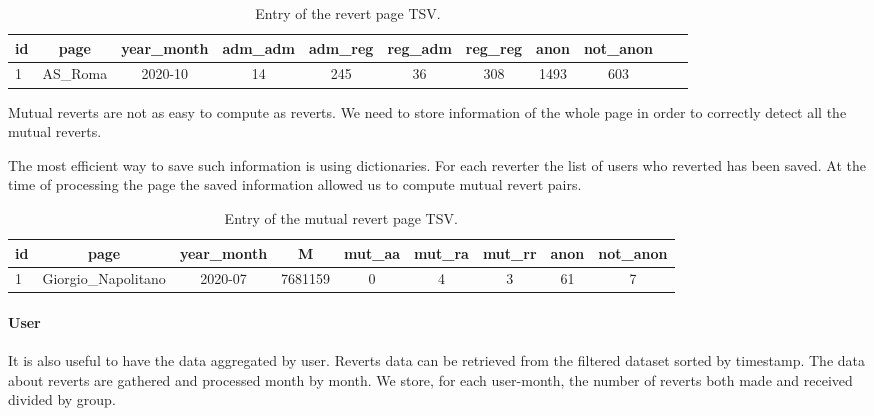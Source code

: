 \begin{table}[H]
    \centering
    \begin{tabularx}{\columnwidth}{@{}Xcccccccccc@{}}
        \midrule
        \textbf{id} & \textbf{page} & \textbf{year\_month} & \textbf{adm\_adm} & \textbf{adm\_reg} & \textbf{reg\_adm} & \textbf{reg\_reg} & \textbf{anon} & \textbf{not\_anon}\\ \toprule
        1 & AS\_Roma & 2020-10 & 14 & 245 & 36 & 308 & 1493 & 603 \\
        
         \bottomrule
    \end{tabularx}
    
    \caption{Entry of the revert page TSV. \label{table:revertpage}}
\end{table}

Mutual reverts are not as easy to compute as reverts. We need to store information of the whole page
in order to correctly detect all the mutual reverts.

The most efficient way to save such information is using dictionaries. For each reverter the list of
users who reverted has been saved. At the time of processing the page the saved information allowed
us to compute mutual revert pairs.

\begin{table}[H]
    \centering
    \begin{tabularx}{\columnwidth}{@{}Xcccccccc@{}}
        \midrule
        \textbf{id} & \textbf{page} & \textbf{year\_month} & \textbf{M}& \textbf{mut\_aa} & \textbf{mut\_ra}  & \textbf{mut\_rr} & \textbf{anon} & \textbf{not\_anon}\\ \toprule
        1 & Giorgio\_Napolitano & 2020-07 & 7681159 & 0 & 4  & 3 & 61 & 7 \\
         \bottomrule
    \end{tabularx}
    
    \caption{Entry of the mutual revert page TSV. \label{table:mutualpage}}
\end{table}

\paragraph*{User}
It is also useful to have the data aggregated by user. Reverts data can be retrieved from the
filtered dataset sorted by timestamp. The data about reverts are gathered and processed month by
month. We store, for each user-month, the number of reverts both made and received divided by group.

